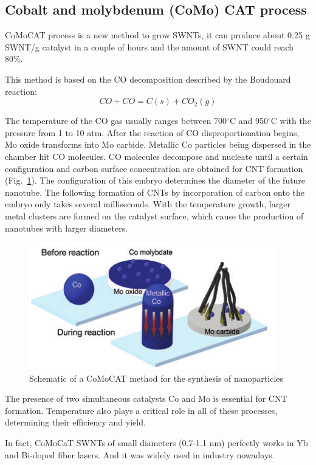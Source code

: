 \documentclass{phyasgn}\usepackage{nag}
\newcommand{\figref}[1]{Fig.~\ref{#1}}
\begin{document}
\subsection{Cobalt and molybdenum (CoMo) CAT process}
CoMoCAT process is a new method to grow SWNTs, it can produce about 0.25 g SWNT/g catalyst in a couple of hours and the amount of SWNT could reach 80\%\cite{kitiyanan2000controlled}.
\par This method is based on the CO decomposition described by the Boudouard reaction:
\begin{equation}
CO+CO=C(s)+CO_2(g)
\end{equation}
\par The temperature of the CO gas usually ranges between 700$^{\circ}$C and 950$^{\circ}$C with the pressure from 1 to 10 atm. After the reaction of CO disproportionation begins, Mo oxide transforms into Mo carbide. Metallic Co particles being dispersed in the chamber hit CO molecules. CO molecules decompose and nucleate until a certain configuration and carbon surface concentration are obtained for CNT formation (\figref{8}). The configuration of this embryo determines the diameter of the future nanotube. The following formation of CNTs by incorporation of carbon onto the embryo only takes several milliseconds. With the temperature growth, larger metal clusters are formed on the catalyst surface, which cause the production of nanotubes with larger diameters\cite{resasco2002scalable}.
\begin{figure}[!h]
	\centering
	\includegraphics[width=.85\linewidth]{pic/8.png}
	\caption[Band structures]{Schematic of a CoMoCAT method for the synthesis of nanoparticles\cite{resasco2002scalable}}
	\label{8}
	\end{figure}
\par The presence of two simultaneous catalysts Co and Mo is essential for CNT formation. Temperature also plays a critical role in all of these processes, determining their efficiency and yield. 
\par In fact, CoMoCaT SWNTs of small diameters (0.7-1.1 nm) perfectly works in Yb and Bi-doped fiber lasers. And it was widely used in industry nowadays. 
\end{document}
